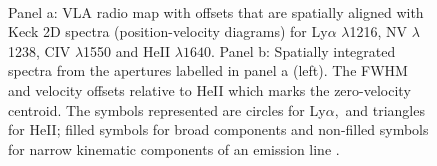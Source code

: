 \documentclass[10pt,a4paper]{article}
\begin{document}
\begin{figure}[!ht]
 \centering
 \\
     \caption[Keck 2D and 1D spectra from \citet{villar-martin2003}]{Panel a: VLA radio map with offsets that are spatially aligned with Keck 2D spectra (position-velocity diagrams) for Ly$\alpha$ $\lambda$1216, NV $\lambda$1238, CIV $\lambda$1550 and HeII $\lambda1640.$ Panel b: Spatially integrated spectra from the apertures labelled in panel a (left). The FWHM and velocity offsets relative to HeII which marks the zero-velocity centroid. The symbols represented are circles for Ly$\alpha,$ and triangles for HeII; filled symbols for broad components and non-filled symbols for narrow kinematic components of an emission line \citep{villar-martin2003}.} 
 \label{fig:kinematics-ionised-Villar_Martin2003}
\end{figure}
\end{document}
